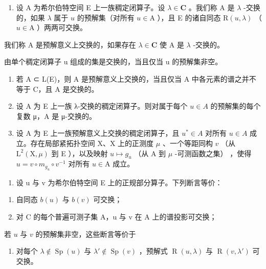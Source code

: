 \begin{enumerate}
\def\labelenumi{\arabic{enumi})}
\setcounter{enumi}{6}
\tightlist
\item
  设 A 为希尔伯特空间 E 上一族稠定闭算子。设 \(\lambda \in \mathbf{C}\) 。我们称 A 是 \(\lambda\) -交换的，如果 \(\lambda\) 属于 \(u\) 的预解集（对所有 \(u \in \mathrm{A}\) ），且 E 的诸自同态 \(\mathrm{R}(u, \lambda)\) （\(u \in \mathrm{A}\) ）两两可交换。
\end{enumerate}

我们称 A 是预解意义上交换的，如果存在 \(\lambda \in \mathbf{C}\) 使 A 是 \(\lambda\) -交换的。

由单个稠定闭算子 u 组成的集是交换的，当且仅当 u 的预解集非空。

\begin{enumerate}
\def\labelenumi{\alph{enumi})}
\item
  若 A ⊂ L(E)，则 A 是预解意义上交换的，当且仅当 A 中各元素的谱之并不等于 C，且 A 是交换的。
\item
  设 A 为 E 上一族 λ-交换的稠定闭算子。则对属于每个 \(u \in A\) 的预解集的每个复数 μ，A 是 μ-交换的。
\item
  设 A 为 E 上一族预解意义上交换的稠定闭算子，且 \(u^{*} \in A\) 对所有 \(u \in A\) 成立。存在局部紧拓扑空间 X、X 上的正测度 \(\mu\) 、一个等距同构 \(v\) （从 \(\mathrm{L}^2 (\mathrm{X},\mu)\) 到 E ），以及映射 \(u\mapsto g_u\) （从 A 到 \(\mu\) -可测函数之集） ，使得 \(u = v\circ m_{g_u}\circ v^{-1}\) 对所有 \(u\in \mathrm{A}\) 成立。
\end{enumerate}

\begin{enumerate}
\def\labelenumi{\arabic{enumi})}
\setcounter{enumi}{7}
\tightlist
\item
  设 u 与 v 为希尔伯特空间 E 上的正规部分算子。下列断言等价：
\end{enumerate}

\begin{enumerate}
\def\labelenumi{\alph{enumi})}
\item
  自同态 \(b(u)\) 与 \(b(v)\) 可交换；
\item
  对 C 的每个普遍可测子集 A，u 与 v 在 A 上的谱投影可交换；
\end{enumerate}

若 \(u\) 与 \(v\) 的预解集非空，这些断言等价于

\begin{enumerate}
\def\labelenumi{\alph{enumi})}
\setcounter{enumi}{2}
\tightlist
\item
  对每个 \(\lambda \notin \operatorname{Sp}(u)\) 与 \(\lambda' \notin \operatorname{Sp}(v)\) ，预解式 \(\operatorname{R}(u, \lambda)\) 与 \(\operatorname{R}(v, \lambda')\) 可交换。
\end{enumerate}

